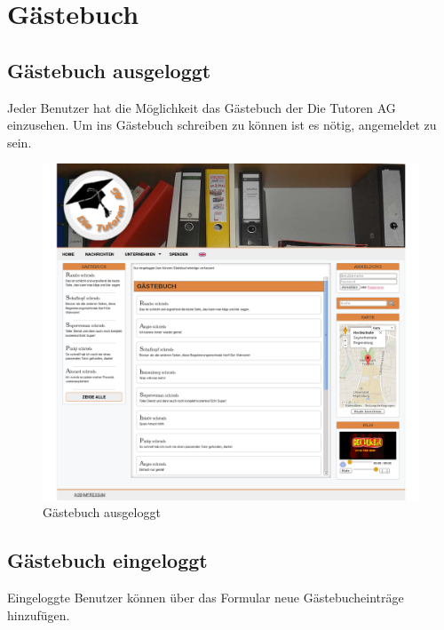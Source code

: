 
\section{Gästebuch}

\subsection{Gästebuch ausgeloggt}

Jeder Benutzer hat die Möglichkeit das Gästebuch der Die Tutoren AG einzusehen. \newline Um ins Gästebuch schreiben zu können ist es nötig, angemeldet zu sein.
\begin{figure}[!htbp]
\centering
\includegraphics[width=1\linewidth]{../Screenshots/de/Gaestebuch}
\caption{Gästebuch ausgeloggt}
\label{fig:Gaestebuch}
\end{figure}

\newpage
\subsection{Gästebuch eingeloggt}

Eingeloggte Benutzer können über das Formular neue Gästebucheinträge hinzufügen.

